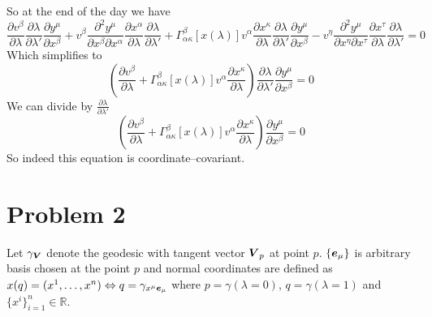 %
So at the end of the day we have
%
\begin{equation}
    \frac{\partial v^\beta}{\partial\lambda}
    \frac{\partial \lambda}{\partial \lambda'}
    \frac{\partial y^\mu}{\partial x^\beta} +
    v^\beta\frac{\partial^2 y^\mu}{\partial x^\beta \partial x^\alpha}
    \frac{\partial x^\alpha}{\partial \lambda}
    \frac{\partial \lambda}{\partial \lambda'}+
    \Gamma_{\alpha\kappa}^\beta\left[x(\lambda)\right]v^\alpha
    \frac{\partial x^\kappa}{\partial \lambda}
    \frac{\partial \lambda}{\partial \lambda'}
    \frac{\partial y^\mu}{\partial x^\beta}-
    v^\eta\frac{\partial^2 y^\mu}{\partial x^\eta \partial x^\tau}
    \frac{\partial x^\tau}{\partial \lambda}
    \frac{\partial \lambda}{\partial \lambda'} = 0
\end{equation}
%
Which simplifies to
%
\begin{equation}
    \left(\frac{\partial v^\beta}{\partial\lambda} +
    \Gamma_{\alpha\kappa}^\beta\left[x(\lambda)\right]v^\alpha
    \frac{\partial x^\kappa}{\partial \lambda}\right)
    \frac{\partial \lambda}{\partial \lambda'}
    \frac{\partial y^\mu}{\partial x^\beta} = 0
\end{equation}
%
We can divide by $\frac{\partial \lambda}{\partial \lambda'}$
%
\begin{equation}
    \boxed{\left(\frac{\partial v^\beta}{\partial\lambda} +
        \Gamma_{\alpha\kappa}^\beta\left[x(\lambda)\right]v^\alpha
        \frac{\partial x^\kappa}{\partial \lambda}\right)
        \frac{\partial y^\mu}{\partial x^\beta} = 0}
\end{equation}
%
So indeed this equation is coordinate--covariant.

\section*{Problem 2}

Let $\gamma_{\boldsymbol{V}}$ denote the geodesic with tangent vector $\boldsymbol{V}_p$ at
point $p$. $\{\boldsymbol{e}_\mu\}$ is arbitrary basis chosen at the point $p$ and
normal coordinates are defined as $x(q)=(x^1,\dots,x^n) \Leftrightarrow
    q=\gamma_{x^\mu \boldsymbol{e}_\mu}$ where $p=\gamma(\lambda=0)$, $q=\gamma(\lambda=1)$
and $\{x^i\}_{i=1}^n \in \mathbb{R}$.


